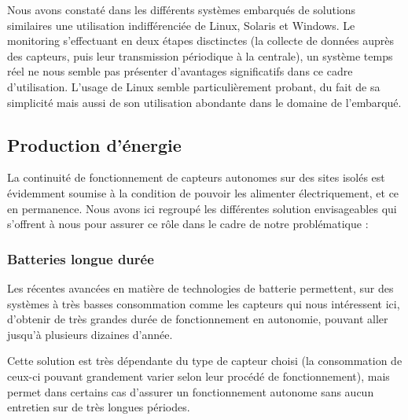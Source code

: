 Nous avons constaté dans les différents systèmes embarqués de solutions similaires une utilisation indifférenciée de Linux, Solaris et Windows\footnotemark. Le monitoring s'effectuant en deux étapes disctinctes (la collecte de données auprès des capteurs, puis leur transmission périodique à la centrale), un système temps réel ne nous semble pas présenter d'avantages significatifs dans ce cadre d'utilisation. L'usage de Linux semble particulièrement probant, du fait de sa simplicité mais aussi de son utilisation abondante dans le domaine de l'embarqué.



\subsection{Production d'énergie}

La continuité de fonctionnement de capteurs autonomes sur des sites isolés est évidemment soumise à la condition de pouvoir les alimenter électriquement, et ce en permanence. Nous avons ici regroupé les différentes solution envisageables qui s’offrent à nous pour assurer ce rôle dans le cadre de notre problématique :

\subsubsection{Batteries longue durée}

Les récentes avancées en matière de technologies de batterie permettent, sur des systèmes à très basses consommation comme les capteurs qui nous intéressent ici, d’obtenir de très grandes durée de fonctionnement en autonomie, pouvant aller jusqu’à plusieurs dizaines d’année\footnotemark.


Cette solution est très dépendante du type de capteur choisi (la consommation de ceux-ci pouvant grandement varier selon leur procédé de fonctionnement), mais permet dans certains cas d’assurer un fonctionnement autonome sans aucun entretien sur de très longues périodes.

